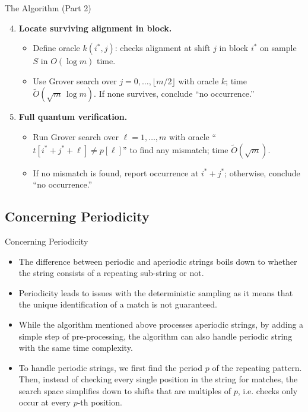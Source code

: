 \documentclass{beamer}
\begin{document}
\begin{frame}{The Algorithm (Part 2)}
  \begin{enumerate}
    \setcounter{enumi}{3}
    \item \textbf{Locate surviving alignment in block.}
          \begin{itemize}
            \item Define oracle \(k(i^*,j)\): checks alignment at shift \(j\) in block \(i^*\) on sample \(S\) in \(O(\log m)\) time.
            \item Use Grover search over \(j=0,\dots,\lfloor m/2\rfloor\) with oracle \(k\); time \(\widetilde O(\sqrt{m}\,\log m)\). If none survives, conclude “no occurrence.”
          \end{itemize}
    \item \textbf{Full quantum verification.}
          \begin{itemize}
            \item Run Grover search over \(\ell=1,\dots,m\) with oracle “\(t[i^*+j^*+\ell]\neq p[\ell]\)” to find any mismatch; time \(\widetilde O(\sqrt{m})\).
            \item If no mismatch is found, report occurrence at \(i^*+j^*\); otherwise, conclude “no occurrence.”
          \end{itemize}
  \end{enumerate}
\end{frame}

\subsection{Concerning Periodicity}
\begin{frame}{Concerning Periodicity}
  \begin{itemize}
    \item The difference between periodic and aperiodic strings boils down to whether the string consists of a repeating sub-string or not.
    \item Periodicity leads to issues with the deterministic sampling as it means that the unique identification of a match is not guaranteed.
    \item While the algorithm mentioned above processes aperiodic strings, by adding a simple step of pre-processing, the algorithm can also handle periodic string with the same time complexity.

    \item To handle periodic strings, we first find the period $p$ of the repeating pattern. Then, instead of checking every single position in the string for matches, the search space simplifies down to shifts that are multiples of $p$, i.e. checks only occur at every $p$-th position.
  \end{itemize}
\end{frame}
\end{document}
